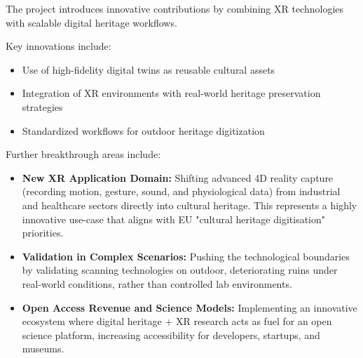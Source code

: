 \noindent The project introduces innovative contributions by combining XR technologies with scalable digital heritage workflows.

Key innovations include:
\begin{itemize}
    \item Use of high-fidelity digital twins as reusable cultural assets
    \item Integration of XR environments with real-world heritage preservation strategies
    \item Standardized workflows for outdoor heritage digitization
\end{itemize}

\vspace{1em}
\noindent Further breakthrough areas include:
\begin{itemize}
    \item \textbf{New XR Application Domain:} Shifting advanced 4D reality capture (recording motion, gesture, sound, and physiological data) from industrial and healthcare sectors directly into cultural heritage. This represents a highly innovative use-case that aligns with EU "cultural heritage digitisation" priorities.
    \item \textbf{Validation in Complex Scenarios:} Pushing the technological boundaries by validating scanning technologies on outdoor, deteriorating ruins under real-world conditions, rather than controlled lab environments.
    \item \textbf{Open Access Revenue and Science Models:} Implementing an innovative ecosystem where digital heritage + XR research acts as fuel for an open science platform, increasing accessibility for developers, startups, and museums.
\end{itemize}